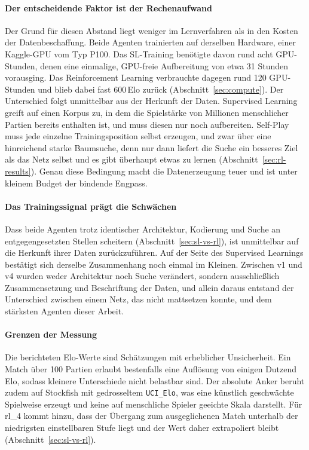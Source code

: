 \documentclass[
  a4paper, 12pt,
  parskip=half,
  headings=small,
  bibliography=totoc
]{scrartcl}
\begin{document}
\paragraph{Der entscheidende Faktor ist der Rechenaufwand}
Der Grund für diesen Abstand liegt weniger im Lernverfahren als in den Kosten der
Datenbeschaffung. Beide Agenten trainierten auf derselben Hardware, einer
Kaggle-GPU vom Typ P100. Das SL-Training benötigte davon rund acht
GPU-Stunden, denen eine einmalige, GPU-freie Aufbereitung von etwa 31 Stunden
vorausging. Das Reinforcement Learning verbrauchte dagegen rund 120 GPU-Stunden und
blieb dabei fast 600\,Elo zurück (Abschnitt~\ref{sec:compute}). Der Unterschied
folgt unmittelbar aus der Herkunft der Daten. Supervised Learning greift auf einen
Korpus zu, in dem die Spielstärke von Millionen menschlicher Partien bereits
enthalten ist, und muss diesen nur noch aufbereiten. Self-Play muss jede einzelne
Trainingsposition selbst erzeugen, und zwar über eine hinreichend starke Baumsuche,
denn nur dann liefert die Suche ein besseres Ziel als das Netz selbst und es gibt
überhaupt etwas zu lernen (Abschnitt~\ref{sec:rl-results}). Genau diese Bedingung
macht die Datenerzeugung teuer und ist unter kleinem Budget der bindende Engpass.

\paragraph{Das Trainingssignal prägt die Schwächen}
Dass beide Agenten trotz identischer Architektur, Kodierung und Suche an
entgegengesetzten Stellen scheitern (Abschnitt~\ref{sec:sl-vs-rl}), ist unmittelbar
auf die Herkunft ihrer Daten zurückzuführen. Auf der Seite des Supervised Learnings
bestätigt sich derselbe Zusammenhang noch einmal im Kleinen.
Zwischen v1 und v4 wurden weder Architektur noch Suche verändert, sondern
ausschließlich Zusammensetzung und Beschriftung der Daten, und allein daraus
entstand der Unterschied zwischen einem Netz, das nicht mattsetzen konnte, und dem
stärksten Agenten dieser Arbeit.

\paragraph{Grenzen der Messung}
Die berichteten Elo-Werte sind Schätzungen mit erheblicher Unsicherheit. Ein Match
über 100 Partien erlaubt bestenfalls eine Auflösung von einigen Dutzend Elo, sodass
kleinere Unterschiede nicht belastbar sind. Der absolute Anker beruht zudem auf
Stockfish mit gedrosseltem \texttt{UCI\_Elo}, was eine künstlich geschwächte
Spielweise erzeugt und keine auf menschliche Spieler geeichte Skala darstellt. Für
rl\_4 kommt hinzu, dass der Übergang zum ausgeglichenen Match unterhalb der
niedrigsten einstellbaren Stufe liegt und der Wert daher extrapoliert bleibt
(Abschnitt~\ref{sec:sl-vs-rl}).
\end{document}
